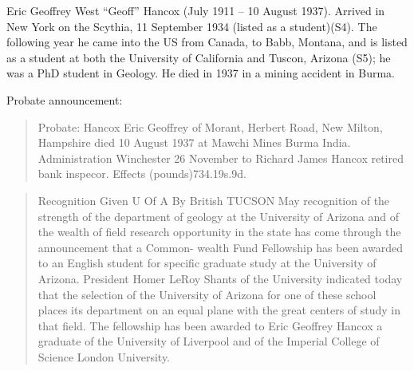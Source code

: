 

Eric Geoffrey West ``Geoff'' Hancox (July 1911 -- 10 August 1937). Arrived in New York on the Scythia, 11 September 1934 (listed as a student)(S4). The following year he came into the US from Canada, to Babb, Montana, and is listed as a student at both the University of California and Tuscon, Arizona (S5); he was a PhD student in Geology. He died in 1937 in a mining accident in Burma.

Probate announcement:
\begin{quotation}
Probate: Hancox Eric Geoffrey of Morant, Herbert Road, New Milton, Hampshire died 10 August 1937 at Mawchi Mines Burma India. Administration Winchester 26 November to Richard James Hancox retired bank inspecor. Effects (pounds)734.19s.9d.
\end{quotation}


\begin{quotation}
Recognition Given U Of A By British TUCSON May recognition of the strength of the department of geology at the University of Arizona and of the wealth of field research opportunity in the state has come through the announcement that a Common- wealth Fund Fellowship has been awarded to an English student for specific graduate study at the University of Arizona. President Homer LeRoy Shants of the University indicated today that the selection of the University of Arizona for one of these school places its department on an equal plane with the great centers of study in that field. The fellowship has been awarded to Eric Geoffrey Hancox a graduate of the University of Liverpool and of the Imperial College of Science London University.
\end{quotation}
